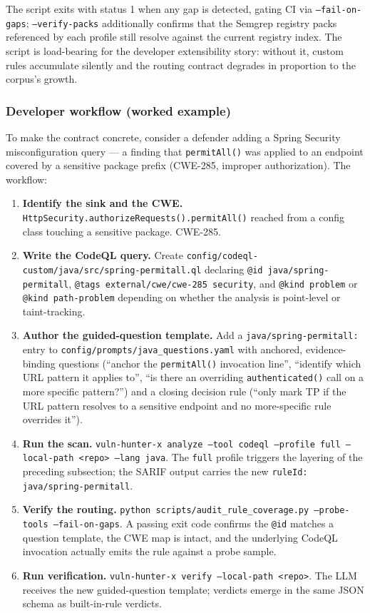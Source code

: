 \documentclass[11pt,a4paper]{article}
\begin{document}
The script exits with status 1 when any gap is detected, gating CI via
\texttt{--fail-on-gaps}; \texttt{--verify-packs} additionally confirms
that the Semgrep registry packs referenced by each profile still
resolve against the current registry index. The script is load-bearing
for the developer extensibility story: without it, custom rules
accumulate silently and the routing contract degrades in proportion to
the corpus's growth.

\subsubsection{Developer workflow (worked example)}

To make the contract concrete, consider a defender adding a Spring
Security misconfiguration query --- a finding that
\texttt{permitAll()} was applied to an endpoint covered by a sensitive
package prefix (CWE-285, improper authorization). The workflow:

\begin{enumerate}[leftmargin=*]
\item \textbf{Identify the sink and the CWE.}
  \texttt{HttpSecurity.authorizeRequests().permitAll()} reached from a
  config class touching a sensitive package. CWE-285.
\item \textbf{Write the CodeQL query.} Create
  \texttt{config/codeql-custom/java/src/spring-permitall.ql} declaring
  \texttt{@id java/spring-permitall},
  \texttt{@tags external/cwe/cwe-285 security}, and
  \texttt{@kind problem} or \texttt{@kind path-problem} depending on
  whether the analysis is point-level or taint-tracking.
\item \textbf{Author the guided-question template.} Add a
  \texttt{java/spring-permitall:} entry to
  \texttt{config/prompts/java\_questions.yaml} with anchored,
  evidence-binding questions (``anchor the \texttt{permitAll()}
  invocation line'', ``identify which URL pattern it applies to'',
  ``is there an overriding \texttt{authenticated()} call on a more
  specific pattern?'') and a closing decision rule (``only mark TP if
  the URL pattern resolves to a sensitive endpoint and no
  more-specific rule overrides it'').
\item \textbf{Run the scan.}
  \texttt{vuln-hunter-x analyze --tool codeql --profile full --local-path
  <repo> --lang java}. The \texttt{full} profile triggers the layering
  of the preceding subsection; the SARIF output carries the new
  \texttt{ruleId: java/spring-permitall}.
\item \textbf{Verify the routing.}
  \texttt{python scripts/audit\_rule\_coverage.py --probe-tools
  --fail-on-gaps}. A passing exit code confirms the \texttt{@id}
  matches a question template, the CWE map is intact, and the
  underlying CodeQL invocation actually emits the rule against a probe
  sample.
\item \textbf{Run verification.}
  \texttt{vuln-hunter-x verify --local-path <repo>}. The LLM receives
  the new guided-question template; verdicts emerge in the same JSON
  schema as built-in-rule verdicts.
\end{enumerate}
\end{document}
